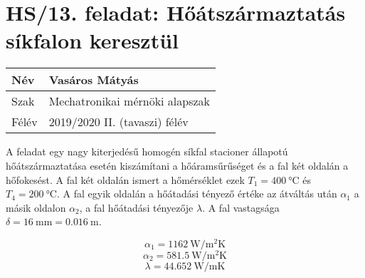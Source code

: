\section*{HS/13. feladat: Hőátszármaztatás síkfalon keresztül}

\begin{tabular}{ | p{2cm} | p{14cm} | } 
	\hline
	Név & Vasáros Mátyás \\ 
	\hline
	Szak & Mechatronikai mérnöki alapszak\\ 
	\hline
	Félév & 2019/2020 II. (tavaszi) félév \\ 
	\hline
\end{tabular}
\vspace{0.5cm}

\noindent A feladat egy nagy kiterjedésű homogén síkfal stacioner állapotú hőátszármaztatása esetén kiszámítani a hőáramsűrűséget és a fal két oldalán a hőfokesést. A fal két oldalán ismert a hőmérséklet ezek $T_{1}=\SI{400}{\degreeCelsius}$ és $T_{4}=\SI{200}{\degreeCelsius}$. A fal egyik oldalán a hőátadási tényező értéke az átváltás után $\alpha_1$ a másik oldalon $\alpha_2$, a fal hőátadási tényezője $\lambda$. A fal vastagsága $\delta=\SI {16}{\milli\meter}=\SI {0,016}{\meter}$.

\begin{equation*}
	\alpha_1=\SI{1162}{\watt\per\meter\squared\kelvin}
\end{equation*}
\begin{equation*}
	\alpha_2=\SI{581,5}{\watt\per\meter\squared\kelvin}
\end{equation*}
\begin{equation*}
	\lambda=\SI{44,652}{\watt\per\meter\kelvin}
\end{equation*}

